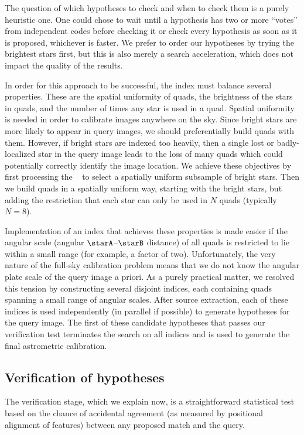 \documentclass[12pt,preprint]{aastex}
\renewcommand{\%}{\percent}
\begin{document}
The question of which hypotheses to check and when to check them is
a purely heuristic one. One could chose to wait until a hypothesis
has two or more ``votes'' from independent codes before checking it
or check every hypothesis as soon as it is proposed, whichever is
faster.  We prefer to order our hypotheses by trying the brightest
stars first, but this is also merely a search acceleration, which
does not impact the quality of the results.

In order for this approach to be successful, the index must balance
several properties.  These are the spatial uniformity of quads, the
brightness of the stars in quads, and the number of times any star is
used in a quad. Spatial uniformity is needed in order to calibrate
images anywhere on the sky. Since bright stars are more likely to
appear in query images, we should preferentially build quads with
them.  However, if bright stars are indexed too heavily, then a single
lost or badly-localized star in the query image leads to the loss of
many quads which could potentially correctly identify the image
location.  We achieve these objectives by first processing the
\USNOB\ \citep{usnob, barron} to select a spatially uniform subsample
of bright stars.  Then we build quads in a spatially uniform way,
starting with the bright stars, but adding the restriction that each
star can only be used in $N$ quads (typically $N=8$).

Implementation of an index that achieves these properties is made
easier if the angular scale (angular $\starA$--$\starB$ distance)
of all quads is
restricted to lie within a small range (for example, a factor of
two). Unfortunately, the very nature of the full-sky calibration problem
means that we do not know the angular plate scale of the query image a
priori. As a purely practical matter, we resolved this tension by
constructing several disjoint indices, each containing quads spanning
a small range of angular scales. After source extraction, each of
these indices is used independently (in parallel if possible) to
generate hypotheses for the query image. The first of these candidate
hypotheses that passes our verification test terminates the search on all
indices and is used to generate the final astrometric
calibration.  

\subsection{Verification of hypotheses}

The verification stage, which we explain now, is a straightforward
statistical test based on the chance of accidental agreement (as
measured by positional alignment of features) between any proposed
match and the query.
\end{document}
